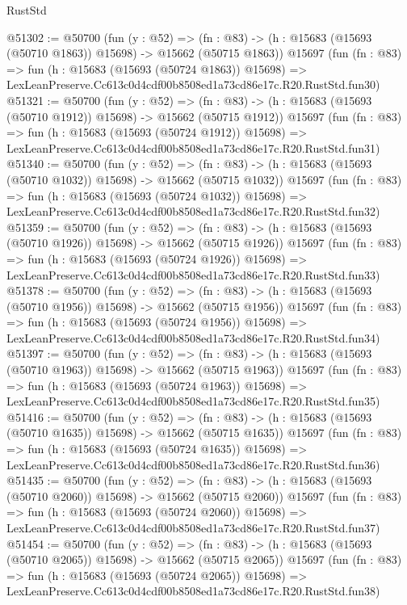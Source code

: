 \begin{lexlean}{RustStd}
\begin{coremodule}
@51302 := @50700
    (fun (y : @52) =>
    (fn : @83) -> (h : @15683 (@15693 (@50710 @1863)) @15698) -> @15662 (@50715 @1863))
    @15697
    (fun (fn : @83) =>
    fun (h : @15683 (@15693 (@50724 @1863)) @15698) =>
    LexLeanPreserve.Cc613c0d4cdf00b8508ed1a73cd86e17c.R20.RustStd.fun30)
@51321 := @50700
    (fun (y : @52) =>
    (fn : @83) -> (h : @15683 (@15693 (@50710 @1912)) @15698) -> @15662 (@50715 @1912))
    @15697
    (fun (fn : @83) =>
    fun (h : @15683 (@15693 (@50724 @1912)) @15698) =>
    LexLeanPreserve.Cc613c0d4cdf00b8508ed1a73cd86e17c.R20.RustStd.fun31)
@51340 := @50700
    (fun (y : @52) =>
    (fn : @83) -> (h : @15683 (@15693 (@50710 @1032)) @15698) -> @15662 (@50715 @1032))
    @15697
    (fun (fn : @83) =>
    fun (h : @15683 (@15693 (@50724 @1032)) @15698) =>
    LexLeanPreserve.Cc613c0d4cdf00b8508ed1a73cd86e17c.R20.RustStd.fun32)
@51359 := @50700
    (fun (y : @52) =>
    (fn : @83) -> (h : @15683 (@15693 (@50710 @1926)) @15698) -> @15662 (@50715 @1926))
    @15697
    (fun (fn : @83) =>
    fun (h : @15683 (@15693 (@50724 @1926)) @15698) =>
    LexLeanPreserve.Cc613c0d4cdf00b8508ed1a73cd86e17c.R20.RustStd.fun33)
@51378 := @50700
    (fun (y : @52) =>
    (fn : @83) -> (h : @15683 (@15693 (@50710 @1956)) @15698) -> @15662 (@50715 @1956))
    @15697
    (fun (fn : @83) =>
    fun (h : @15683 (@15693 (@50724 @1956)) @15698) =>
    LexLeanPreserve.Cc613c0d4cdf00b8508ed1a73cd86e17c.R20.RustStd.fun34)
@51397 := @50700
    (fun (y : @52) =>
    (fn : @83) -> (h : @15683 (@15693 (@50710 @1963)) @15698) -> @15662 (@50715 @1963))
    @15697
    (fun (fn : @83) =>
    fun (h : @15683 (@15693 (@50724 @1963)) @15698) =>
    LexLeanPreserve.Cc613c0d4cdf00b8508ed1a73cd86e17c.R20.RustStd.fun35)
@51416 := @50700
    (fun (y : @52) =>
    (fn : @83) -> (h : @15683 (@15693 (@50710 @1635)) @15698) -> @15662 (@50715 @1635))
    @15697
    (fun (fn : @83) =>
    fun (h : @15683 (@15693 (@50724 @1635)) @15698) =>
    LexLeanPreserve.Cc613c0d4cdf00b8508ed1a73cd86e17c.R20.RustStd.fun36)
@51435 := @50700
    (fun (y : @52) =>
    (fn : @83) -> (h : @15683 (@15693 (@50710 @2060)) @15698) -> @15662 (@50715 @2060))
    @15697
    (fun (fn : @83) =>
    fun (h : @15683 (@15693 (@50724 @2060)) @15698) =>
    LexLeanPreserve.Cc613c0d4cdf00b8508ed1a73cd86e17c.R20.RustStd.fun37)
@51454 := @50700
    (fun (y : @52) =>
    (fn : @83) -> (h : @15683 (@15693 (@50710 @2065)) @15698) -> @15662 (@50715 @2065))
    @15697
    (fun (fn : @83) =>
    fun (h : @15683 (@15693 (@50724 @2065)) @15698) =>
    LexLeanPreserve.Cc613c0d4cdf00b8508ed1a73cd86e17c.R20.RustStd.fun38)

\end{coremodule}
\end{lexlean}
